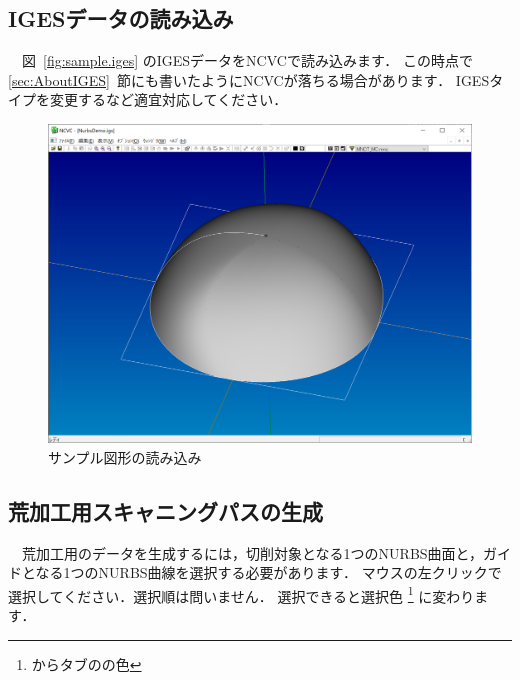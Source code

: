 
\subsection{IGESデータの読み込み}
　図~\ref{fig:sample.iges} のIGESデータをNCVCで読み込みます．
この時点で \ref{sec:AboutIGES}~節にも書いたようにNCVCが落ちる場合があります．
IGESタイプを変更するなど適宜対応してください．

\begin{figure}[H]
\centering
\includegraphics[scale=0.5]{No2/fig/fig21.png}
\caption{サンプル図形の読み込み}
\label{fig:ncvc21}
\end{figure}

\subsection{荒加工用スキャニングパスの生成}
　荒加工用のデータを生成するには，切削対象となる1つのNURBS曲面と，ガイドとなる1つのNURBS曲線を選択する必要があります．
マウスの左クリックで選択してください．選択順は問いません．
選択できると選択色
\footnote{からタブのの色}
に変わります．

